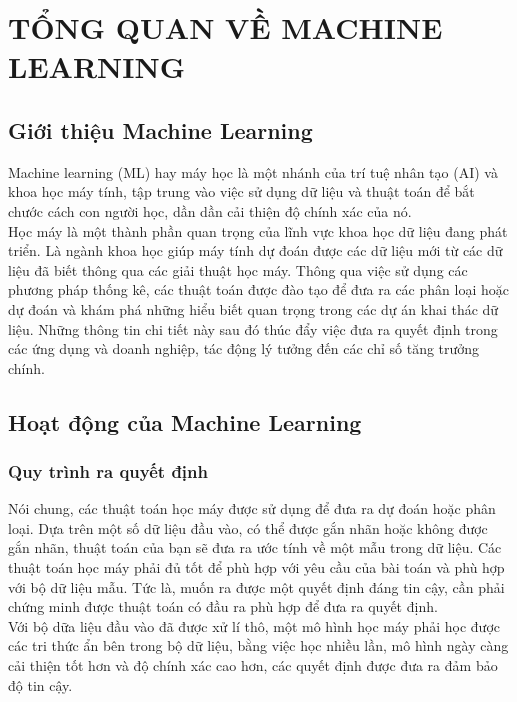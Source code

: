 \chapter{TỔNG QUAN VỀ MACHINE LEARNING}
\section{Giới thiệu Machine Learning}
Machine learning (ML) hay máy học là một nhánh của trí tuệ nhân tạo (AI) và khoa học máy tính, tập trung vào việc sử dụng dữ liệu và thuật toán để bắt chước cách con người học, dần dần cải thiện độ chính xác của nó.\\
Học máy là một thành phần quan trọng của lĩnh vực khoa học dữ liệu đang phát triển. Là ngành khoa học giúp máy tính dự đoán được các dữ liệu mới từ các dữ liệu đã biết thông qua các giải thuật học máy. Thông qua việc sử dụng các phương pháp thống kê, các thuật toán được đào tạo để đưa ra các phân loại hoặc dự đoán và khám phá những hiểu biết quan trọng trong các dự án khai thác dữ liệu. Những thông tin chi tiết này sau đó thúc đẩy việc đưa ra quyết định trong các ứng dụng và doanh nghiệp, tác động lý tưởng đến các chỉ số tăng trưởng chính.
\section{Hoạt động của Machine Learning}
\subsection{Quy trình ra quyết định}
Nói chung, các thuật toán học máy được sử dụng để đưa ra dự đoán hoặc phân loại. Dựa trên một số dữ liệu đầu vào, có thể được gắn nhãn hoặc không được gắn nhãn, thuật toán của bạn sẽ đưa ra ước tính về một mẫu trong dữ liệu. Các thuật toán học máy phải đủ tốt để phù hợp với yêu cầu của bài toán và phù hợp với bộ dữ liệu mẫu. Tức là, muốn ra được một quyết định đáng tin cậy, cần phải chứng minh được thuật toán có đầu ra phù hợp để đưa ra quyết định.\\
Với bộ dữa liệu đầu vào đã được xử lí thô, một mô hình học máy phải học được các tri thức ẩn bên trong bộ dữ liệu, bằng việc học nhiều lần, mô hình ngày càng cải thiện tốt hơn và độ chính xác cao hơn, các quyết định được đưa ra đảm bảo độ tin cậy.
